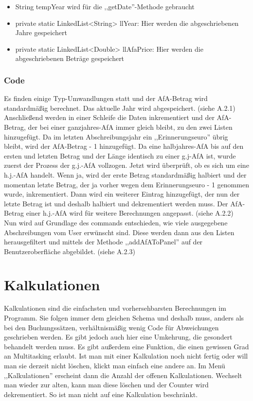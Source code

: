 \documentclass[12pt]{report}
\begin{document}
\begin{itemize}
	\item String tempYear wird für die ,,getDate''-Methode gebraucht
	\item private static LinkedList<String> llYear: Hier werden die abgeschriebenen Jahre gespeichert
	\item private static LinkedList<Double> llAfaPrice: Hier werden die abgeschriebenen Beträge gespeichert
\end{itemize}

\subsubsection{Code}
Es finden einige Typ-Umwandlungen statt und der AfA-Betrag wird standardmäßig berechnet. Das aktuelle Jahr wird abgespeichert. (siehe A.2.1)\\



\noindent Anschließend werden in einer Schleife die Daten inkrementiert und der AfA-Betrag, der bei einer ganzjahres-AfA immer gleich bleibt, zu den zwei Listen hinzugefügt.  Da im letzten Abschreibungsjahr ein ,,Erinnerungseuro'' übrig bleibt, wird der AfA-Betrag - 1 hinzugefügt. Da eine halbjahres-AfA bis auf den ersten und letzten Betrag und der Länge identisch zu einer g.j-AfA ist, wurde zuerst der Prozess der g.j.-AfA vollzogen. Jetzt wird überprüft, ob es sich um eine h.j.-AfA handelt. Wenn ja, wird der erste Betrag standardmäßig halbiert und der momentan letzte Betrag, der ja vorher wegen dem Erinnerungseuro - 1 genommen wurde, inkrementiert. Dann wird ein weiterer Eintrag hinzugefügt, der nun der letzte Betrag ist und deshalb halbiert und dekrementiert werden muss. Der AfA-Betrag einer h.j.-AfA wird für weitere Berechnungen angepasst. (siehe A.2.2)\\
	

\noindent Nun wird auf Grundlage des commands entschieden, wie viele ausgegebene Abschreibungen vom User erwünscht sind. Diese werden dann aus den Listen herausgefiltert und mittels der Methode ,,addAfAToPanel'' auf der Benutzeroberfläche abgebildet. (siehe A.2.3)
  
\section{Kalkulationen}
Kalkulationen sind die einfachsten und vorhersehbarsten Berechnungen im Programm. Sie folgen immer dem gleichen Schema und deshalb muss, anders als bei den Buchungssätzen, verhältnismäßig wenig Code für Abweichungen geschrieben werden. Es gibt jedoch auch hier eine Umkehrung, die gesondert behandelt werden muss. Es gibt außerdem eine Funktion, die einen gewissen Grad an Multitasking erlaubt. Ist man mit einer Kalkulation noch nicht fertig oder will man sie derzeit nicht löschen, klickt man einfach eine andere an. Im Menü ,,Kalkulationen'' erscheint dann die Anzahl der offenen Kalkulationen. Wechselt man wieder zur alten, kann man diese löschen und der Counter wird dekrementiert. So ist man nicht auf eine Kalkulation beschränkt.
\end{document}
